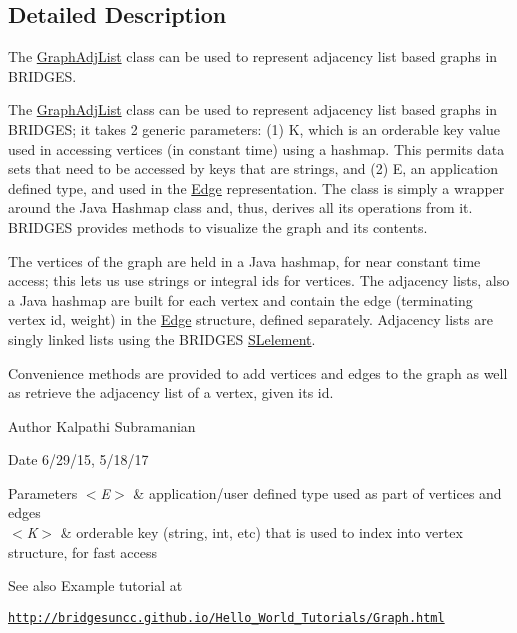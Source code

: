 \subsection{Detailed Description}
The \hyperlink{class_graph_adj_list_1_1_graph_adj_list}{Graph\+Adj\+List} class can be used to represent adjacency list based graphs in B\+R\+I\+D\+G\+E\+S. 

The \hyperlink{class_graph_adj_list_1_1_graph_adj_list}{Graph\+Adj\+List} class can be used to represent adjacency list based graphs in B\+R\+I\+D\+G\+E\+S; it takes 2 generic parameters\+: (1) K, which is an orderable key value used in accessing vertices (in constant time) using a hashmap. This permits data sets that need to be accessed by keys that are strings, and (2) E, an application defined type, and used in the \hyperlink{namespace_edge}{Edge} representation. The class is simply a wrapper around the Java Hashmap class and, thus, derives all its operations from it. B\+R\+I\+D\+G\+E\+S provides methods to visualize the graph and its contents.

The vertices of the graph are held in a Java hashmap, for near constant time access; this lets us use strings or integral ids for vertices. The adjacency lists, also a Java hashmap are built for each vertex and contain the edge (terminating vertex id, weight) in the \hyperlink{namespace_edge}{Edge} structure, defined separately. Adjacency lists are singly linked lists using the B\+R\+I\+D\+G\+E\+S \hyperlink{namespace_s_lelement}{S\+Lelement}.

Convenience methods are provided to add vertices and edges to the graph as well as retrieve the adjacency list of a vertex, given its id.

\begin{DoxyAuthor}{Author}
Kalpathi Subramanian
\end{DoxyAuthor}
\begin{DoxyDate}{Date}
6/29/15, 5/18/17
\end{DoxyDate}

\begin{DoxyParams}{Parameters}
{\em $<$\+E$>$} & application/user defined type used as part of vertices and edges \\
\hline
{\em $<$\+K$>$} & orderable key (string, int, etc) that is used to index into vertex structure, for fast access\\
\hline
\end{DoxyParams}
\begin{DoxySeeAlso}{See also}
Example tutorial at 
\end{DoxySeeAlso}
\href{http://bridgesuncc.github.io/Hello_World_Tutorials/Graph.html}{\tt http\+://bridgesuncc.\+github.\+io/\+Hello\+\_\+\+World\+\_\+\+Tutorials/\+Graph.\+html} 

